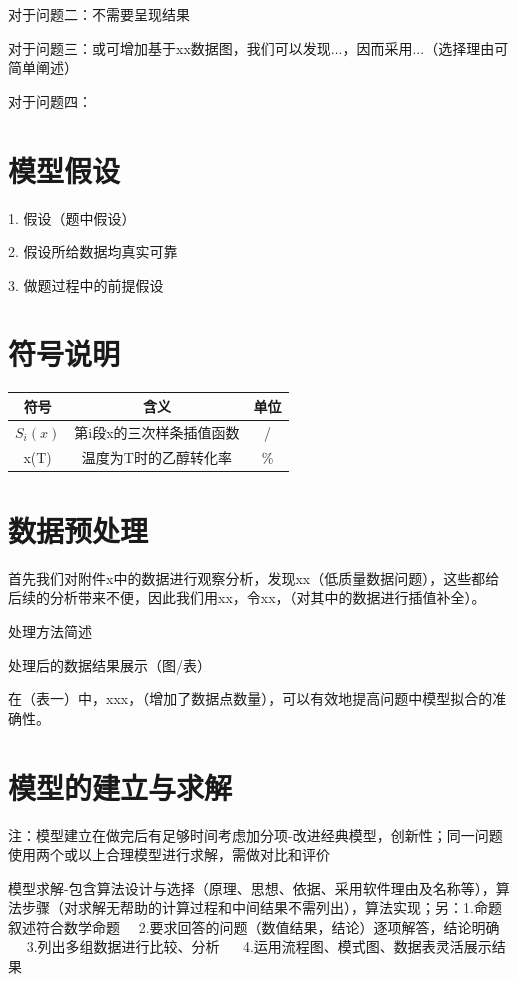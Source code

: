\documentclass{ctexart}
\begin{document}
对于问题二：不需要呈现结果

对于问题三：或可增加基于xx数据图，我们可以发现...，因而采用...（选择理由可简单阐述）

对于问题四：

\section{模型假设}
1. \quad 假设（题中假设）

2. \quad 假设所给数据均真实可靠

3. \quad 做题过程中的前提假设
\section{符号说明}

\begin{table}[!htbp]
    \centering
    \begin{tabular}{ccc}
    \toprule
    符号& 含义& 单位\\
    \midrule
    $S_i(x)$&第i段x的三次样条插值函数&/\\
    x(T)&温度为T时的乙醇转化率&\%\\
    \bottomrule
    \end{tabular}
    \end{table}

\section{数据预处理}
首先我们对附件x中的数据进行观察分析，发现xx（低质量数据问题），这些都给后续的分析带来不便，因此我们用xx，令xx，（对其中的数据进行插值补全）。

处理方法简述

处理后的数据结果展示（图/表）

在（表一）中，xxx，（增加了数据点数量），可以有效地提高问题中模型拟合的准确性。
\section{模型的建立与求解}

注：模型建立在做完后有足够时间考虑加分项-改进经典模型，创新性；同一问题使用两个或以上合理模型进行求解，需做对比和评价

模型求解-包含算法设计与选择（原理、思想、依据、采用软件理由及名称等），算法步骤（对求解无帮助的计算过程和中间结果不需列出），算法实现；另：1.命题叙述符合数学命题$\quad$ 2.要求回答的问题（数值结果，结论）逐项解答，结论明确$\quad$ 3.列出多组数据进行比较、分析 $\quad$ 4.运用流程图、模式图、数据表灵活展示结果
\end{document}
